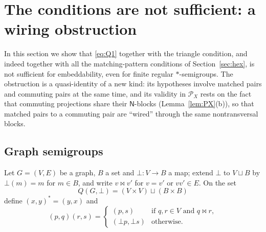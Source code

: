 \documentclass[11pt]{amsart}
\theoremstyle{definition}
\renewcommand{\P}{\mathcal{P}}
\newcommand{\N}{\mathsf{N}}
\newcommand{\mt}{\bowtie}   %
\begin{document}
\section{The conditions are not sufficient: a wiring obstruction}\label{sec:wiring}

In this section we show that \eqref{eq:Q1} together with the triangle condition, and indeed together with all the matching-pattern conditions of Section~\ref{sec:hex}, is not sufficient for embeddability, even for finite regular $*$-semigroups. The obstruction is a quasi-identity of a new kind: its hypotheses involve matched pairs and commuting pairs at the same time, and its validity in $\P_X$ rests on the fact that commuting projections share their $\N$-blocks (Lemma~\ref{lem:PX}(b)), so that matched pairs to a commuting pair are ``wired'' through the same nontransversal blocks.

\subsection{Graph semigroups}\label{subsec:graphsg}

Let $G=(V,E)$ be a graph, $B$ a set and $\bot\colon V\to B$ a map; extend $\bot$ to $V\sqcup B$ by $\bot(m)=m$ for $m\in B$, and write $v\mt v'$ for $v=v'$ or $vv'\in E$. On the set
\[
Q(G,\bot)=(V\times V)\sqcup(B\times B)
\]
define $(x,y)^*=(y,x)$ and
\[
(p,q)(r,s)=\begin{cases}(p,s)&\text{if }q,r\in V\text{ and }q\mt r,\\ (\bot p,\bot s)&\text{otherwise.}\end{cases}
\]
\end{document}
